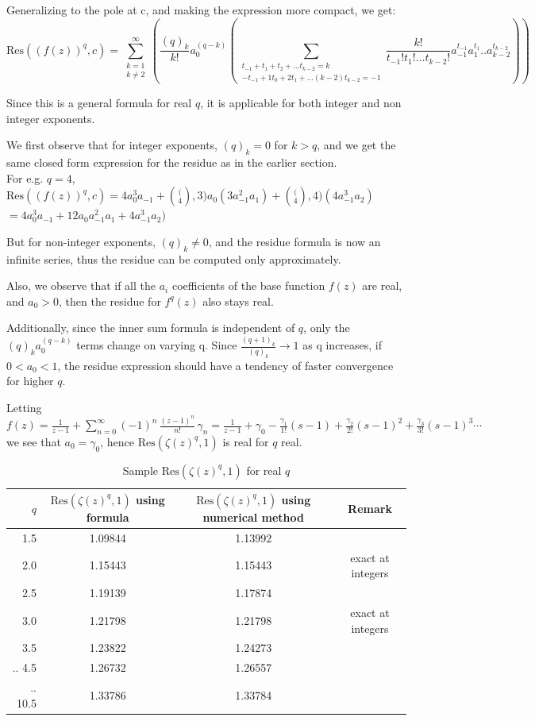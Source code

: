 \documentclass[a4paper,11pt,twoside]{amsart}
\newcommand\Res{\mathrm{Res}}
\begin{document}
Generalizing to the pole at c, and making the expression more compact, we get: 
$$\Res((f(z))^q,c) = \sum\limits_{\substack{k=1 \\ k \ne 2}}^{\infty} \left(\frac{(q)_{k}}{k!} a_{0}^{(q-k)} \left(\sum\limits_{\substack{t_{-1} + t_1 + t_2 + ... t_{k-2} = k \\ -t_{-1} + 1t_0 + 2t_1 + ... (k-2)t_{k-2} = -1}} \frac{k!}{t_{-1}!t_{1}!...t_{k-2}!} a_{-1}^{t_{-1}} a_{1}^{t_1}..a_{k-2}^{t_{k-2}}\right)\right)$$

Since this is a general formula for real $q$, it is applicable for both integer and non integer exponents.

We first observe that for integer exponents, $(q)_k = 0$ for $k>q$, and we get the same closed form expression for the residue as in the earlier section.\\
For e.g. $q=4$, $\Res((f(z))^q,c) = 4 a_{0}^3 a_{-1} + \binom(4,3) a_0 (3 a_{-1}^2 a_1) + \binom(4,4) (4 a_{-1}^3 a_2)$
$=4 a_{0}^3 a_{-1} + 12 a_0 a_{-1}^2 a_1 + 4 a_{-1}^3 a_2)$

But for non-integer exponents, $(q)_k \ne 0$, and the residue formula is now an infinite series, thus the residue can be computed only approximately.

Also, we observe that if all the $a_i$ coefficients of the base function $f(z)$ are real, and $a_0 > 0$, then the residue for $f^{q}(z)$ also stays real. 

Additionally, since the inner sum formula is independent of $q$, only the $(q)_k a_{0}^{(q-k)}$ terms change on varying q. Since $\frac{(q+1)_k}{(q)_k} \to 1$ as q increases, if $0 < a_0 < 1$, the residue expression should have a tendency of faster convergence for higher $q$. 

Letting $f(z) = \frac{1}{z-1} + \sum\limits_{n=0}^{\infty} (-1)^n\,\frac{(z-1)^n}{n!}\, \gamma_n = \frac{1}{z-1} + \gamma_0 - \frac{\gamma_1}{1!}(s-1) + \frac{\gamma_2}{2!}(s-1)^2 + \frac{\gamma_3}{3!}(s-1)^3 \cdots$ we see that $a_0 = \gamma_0$, hence $\Res(\zeta(z)^{q},1)$ is real for $q$ real.

\begin{table}[H]
  \begin{center}
    \caption{Sample $\Res(\zeta(z)^{q},1)$ for real $q$}
    \label{tab:table3}
    \begin{tabular}{r|c|c|c} 
      $q$ & $\Res(\zeta(z)^{q},1)$ using formula & $\Res(\zeta(z)^{q},1)$ using numerical method & Remark\\
      \hline
      1.5 & 1.09844 & 1.13992\\
      2.0 & 1.15443 & 1.15443 & exact at integers\\
      2.5 & 1.19139 & 1.17874\\
      3.0 & 1.21798 & 1.21798 & exact at integers\\
      3.5 & 1.23822 & 1.24273\\
      ..
      4.5 & 1.26732 & 1.26557 \\
      ..
      10.5 & 1.33786 & 1.33784 \\ 
    \end{tabular}
  \end{center}
\end{table}
\end{document}
